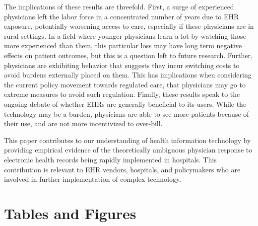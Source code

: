 \documentclass[11pt]{article}
\begin{document}
The implications of these results are threefold. First, a surge of experienced physicians left the labor force in a concentrated number of years due to EHR exposure, potentially worsening access to care, especially if these physicians are in rural settings. In a field where younger physicians learn a lot by watching those more experienced than them, this particular loss may have long term negative effects on patient outcomes, but this is a question left to future research. Further, physicians are exhibiting behavior that suggests they incur switching costs to avoid burdens externally placed on them. This has implications when considering the current policy movement towards regulated care, that physicians may go to extreme measures to avoid such regulation. Finally, these results speak to the ongoing debate of whether EHRs are generally beneficial to its users. While the technology may be a burden, physicians are able to see more patients because of their use, and are not more incentivized to over-bill. 

This paper contributes to our understanding of health information technology by providing empirical evidence of the theoretically ambiguous physician response to electronic health records being rapidly implemented in hospitals. This contribution is relevant to EHR vendors, hospitals, and policymakers who are involved in further implementation of complex technology. 



\section{Tables and Figures}
\end{document}
